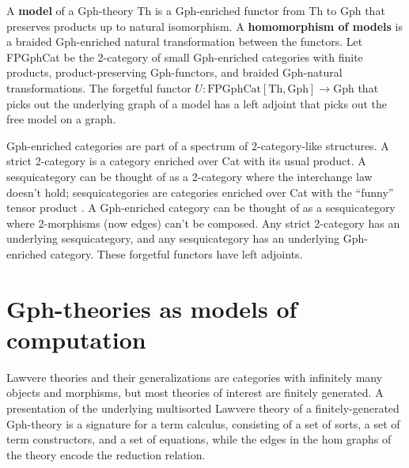 \documentclass[a4paper,UKenglish]{lipics-v2016}
\newcommand{\maps}{\colon}
\newcommand{\Th}{\mathrm{Th}}
\newcommand{\Gph}{\mathrm{Gph}}
\newcommand{\FPGphCat}{\mathrm{FPGphCat}}
\begin{document}
A {\bf model} of a Gph-theory Th is a Gph-enriched functor from Th to Gph that preserves products up to natural isomorphism.  A {\bf homomorphism of models} is a braided Gph-enriched natural transformation between the functors.  Let FPGphCat be the 2-category of small Gph-enriched categories with finite products, product-preserving Gph-functors, and braided Gph-natural transformations.  The forgetful functor $U\maps \FPGphCat[\Th, \Gph] \to \Gph$ that picks out the underlying graph of a model has a left adjoint that picks out the free model on a graph.

Gph-enriched categories are part of a spectrum of 2-category-like structures.  A strict 2-category is a category enriched over Cat with its usual product.  A sesquicategory can be thought of as a 2-category where the interchange law doesn't hold; sesquicategories are categories enriched over Cat with the ``funny'' tensor product \cite{Lack2CategoriesCompanion}.  A Gph-enriched category can be thought of as a sesquicategory where 2-morphisms (now edges) can't be composed.  Any strict 2-category has an underlying sesquicategory, and any sesquicategory has an underlying Gph-enriched category.  These forgetful functors have left adjoints.

\section{Gph-theories as models of computation}

Lawvere theories and their generalizations are categories with infinitely many objects and morphisms, but most theories of interest are finitely generated.  A presentation of the underlying multisorted Lawvere theory of a finitely-generated Gph-theory is a signature for a term calculus, consisting of a set of sorts, a set of term constructors, and a set of equations, while the edges in the hom graphs of the theory encode the reduction relation.
\end{document}
